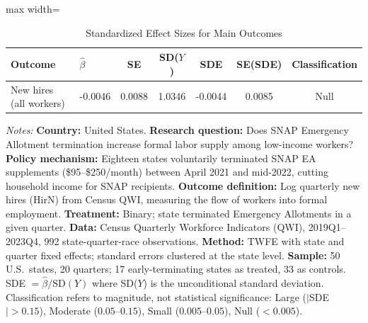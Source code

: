 
\begin{table}[H]
\centering
\caption{Standardized Effect Sizes for Main Outcomes}
\label{tab:sde}
\begin{adjustbox}{max width=\textwidth}
\begin{threeparttable}
\begin{tabular}{llccccc}
\toprule
Outcome & $\hat{\beta}$ & SE & SD($Y$) & SDE & SE(SDE) & Classification \\
\midrule
New hires (all workers) & -0.0046 & 0.0088 & 1.0346 & -0.0044 & 0.0085 & Null \\
\bottomrule
\end{tabular}
\begin{tablenotes}[flushleft]
\small
\item \textit{Notes:} \footnotesize \textbf{Country:} United States. \textbf{Research question:} Does SNAP Emergency Allotment termination increase formal labor supply among low-income workers? \textbf{Policy mechanism:} Eighteen states voluntarily terminated SNAP EA supplements (\$95--\$250/month) between April 2021 and mid-2022, cutting household income for SNAP recipients. \textbf{Outcome definition:} Log quarterly new hires (HirN) from Census QWI, measuring the flow of workers into formal employment. \textbf{Treatment:} Binary; state terminated Emergency Allotments in a given quarter. \textbf{Data:} Census Quarterly Workforce Indicators (QWI), 2019Q1--2023Q4, 992 state-quarter-race observations. \textbf{Method:} TWFE with state and quarter fixed effects; standard errors clustered at the state level. \textbf{Sample:} 50 U.S.\ states, 20 quarters; 17 early-terminating states as treated, 33 as controls. SDE $= \hat{\beta} / \text{SD}(Y)$ where SD($Y$) is the unconditional standard deviation. Classification refers to magnitude, not statistical significance: Large ($|$SDE$| > 0.15$), Moderate ($0.05$--$0.15$), Small ($0.005$--$0.05$), Null ($< 0.005$).
\end{tablenotes}
\end{threeparttable}
\end{adjustbox}
\end{table}
